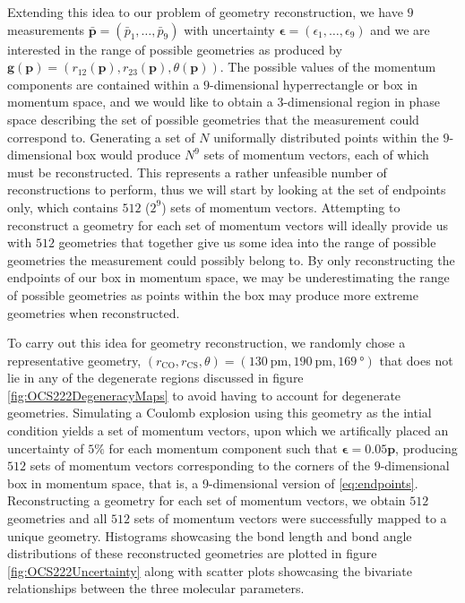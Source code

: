 Extending this idea to our problem of geometry reconstruction, we have $9$ measurements $\bar{\mathbf{p}} = (\bar{p}_1, \dots, \bar{p}_9)$ with uncertainty $\bm{\epsilon} = (\epsilon_1, \dots, \epsilon_9)$ and we are interested in the range of possible geometries as produced by $\mathbf{g}(\mathbf{p}) = (r_{12}(\mathbf{p}), r_{23}(\mathbf{p}), \theta(\mathbf{p}))$. The possible values of the momentum components are contained within a $9$-dimensional hyperrectangle or box in momentum space, and we would like to obtain a $3$-dimensional region in phase space describing the set of possible geometries that the measurement could correspond to. Generating a set of $N$ uniformally distributed points within the $9$-dimensional box would produce $N^9$ sets of momentum vectors, each of which must be reconstructed. This represents a rather unfeasible number of reconstructions to perform, thus we will start by looking at the set of endpoints only, which contains $512$ ($2^9$) sets of momentum vectors. Attempting to reconstruct a geometry for each set of momentum vectors will ideally provide us with $512$ geometries that together give us some idea into the range of possible geometries the measurement could possibly belong to. By only reconstructing the endpoints of our box in momentum space, we may be underestimating the range of possible geometries as points within the box may produce more extreme geometries when reconstructed.

To carry out this idea for geometry reconstruction, we randomly chose a representative geometry, $(r_\mathrm{CO}, r_\mathrm{CS}, \theta) = (\SI{130}{\pico\m}, \SI{190}{\pico\m}, \SI{169}{\degree})$ that does not lie in any of the degenerate regions discussed in figure \ref{fig:OCS222DegeneracyMaps} to avoid having to account for degenerate geometries. Simulating a Coulomb explosion using this geometry as the intial condition yields a set of momentum vectors, upon which we artifically placed an uncertainty of $5\%$ for each momentum component such that $\bm{\epsilon} = 0.05\mathbf{p}$, producing $512$ sets of momentum vectors corresponding to the corners of the $9$-dimensional box in momentum space, that is, a 9-dimensional version of \eqref{eq:endpoints}. Reconstructing a geometry for each set of momentum vectors, we obtain $512$ geometries and all $512$ sets of momentum vectors were successfully mapped to a unique geometry. Histograms showcasing the bond length and bond angle distributions of these reconstructed geometries are plotted in figure \ref{fig:OCS222Uncertainty} along with scatter plots showcasing the bivariate relationships between the three molecular parameters.

